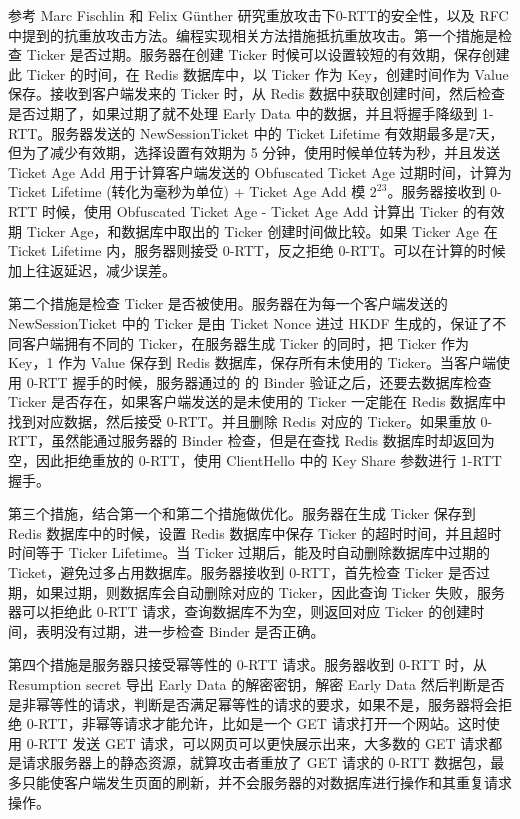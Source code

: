 参考 Marc Fischlin 和 Felix Günther\cite{7961952} 研究重放攻击下0-RTT的安全性，以及 RFC 中提到的抗重放攻击方法。编程实现相关方法措施抵抗重放攻击。第一个措施是检查 Ticker 是否过期。服务器在创建 Ticker 时候可以设置较短的有效期，保存创建此 Ticker 的时间，在 Redis 数据库中，以 Ticker 作为 Key，创建时间作为 Value 保存。接收到客户端发来的 Ticker 时，从 Redis 数据中获取创建时间，然后检查是否过期了，如果过期了就不处理 Early Data 中的数据，并且将握手降级到 1-RTT。服务器发送的 NewSessionTicket 中的 Ticket Lifetime 有效期最多是7天，但为了减少有效期，选择设置有效期为 5 分钟，使用时候单位转为秒，并且发送 Ticket Age Add 用于计算客户端发送的 Obfuscated Ticket Age 过期时间，计算为 Ticket Lifetime (转化为毫秒为单位) + Ticket Age Add 模 $2^{23}$。服务器接收到 0-RTT 时候，使用 Obfuscated Ticket Age - Ticket Age Add 计算出 Ticker 的有效期 Ticker Age，和数据库中取出的 Ticker 创建时间做比较。如果 Ticker Age 在 Ticket Lifetime 内，服务器则接受 0-RTT，反之拒绝 0-RTT。可以在计算的时候加上往返延迟，减少误差。

第二个措施是检查 Ticker 是否被使用。服务器在为每一个客户端发送的 NewS\-essionTicket 中的 Ticker 是由 Ticket Nonce 进过 HKDF 生成的，保证了不同客户端拥有不同的 Ticker，在服务器生成 Ticker 的同时，把 Ticker 作为 Key，1 作为 Value 保存到 Redis 数据库，保存所有未使用的 Ticker。当客户端使用 0-RTT 握手的时候，服务器通过的 的 Binder 验证之后，还要去数据库检查 Ticker 是否存在，如果客户端发送的是未使用的 Ticker 一定能在 Redis 数据库中找到对应数据，然后接受 0-RTT。并且删除 Redis 对应的 Ticker。如果重放 0-RTT，虽然能通过服务器的 Binder 检查，但是在查找 Redis 数据库时却返回为空，因此拒绝重放的 0-RTT，使用 ClientHello 中的 Key Share 参数进行 1-RTT 握手。

第三个措施，结合第一个和第二个措施做优化。服务器在生成 Ticker 保存到 Redis 数据库中的时候，设置 Redis 数据库中保存 Ticker 的超时时间，并且超时时间等于 Ticker Lifetime。当 Ticker 过期后，能及时自动删除数据库中过期的 Ticket，避免过多占用数据库。服务器接收到 0-RTT，首先检查 Ticker 是否过期，如果过期，则数据库会自动删除对应的 Ticker，因此查询 Ticker 失败，服务器可以拒绝此 0-RTT 请求，查询数据库不为空，则返回对应 Ticker 的创建时间，表明没有过期，进一步检查 Binder 是否正确。

第四个措施是服务器只接受幂等性的 0-RTT 请求。服务器收到 0-RTT 时，从 Resumption secret 导出 Early Data 的解密密钥，解密 Early Data 然后判断是否是非幂等性的请求，判断是否满足幂等性的请求的要求，如果不是，服务器将会拒绝 0-RTT，非幂等请求才能允许，比如是一个 GET 请求打开一个网站。这时使用 0-RTT 发送 GET 请求，可以网页可以更快展示出来，大多数的 GET 请求都是请求服务器上的静态资源，就算攻击者重放了 GET 请求的 0-RTT 数据包，最多只能使客户端发生页面的刷新，并不会服务器的对数据库进行操作和其重复请求操作。

